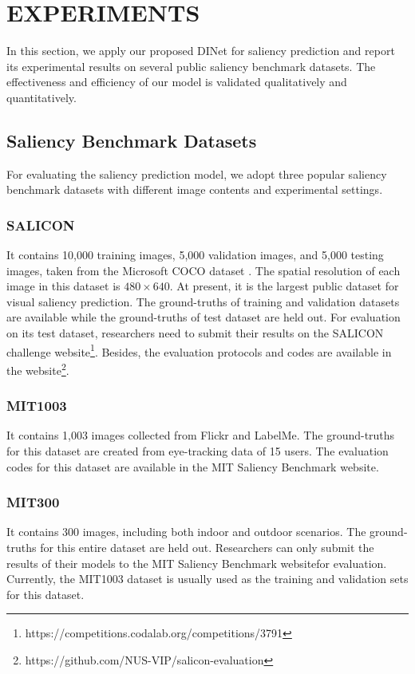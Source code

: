 \section{EXPERIMENTS}
\label{sec:exp}


In this section, we apply our proposed DINet for saliency prediction and report its experimental results on several public saliency benchmark datasets. The effectiveness and efficiency of our model is validated qualitatively and quantitatively. 

\subsection{Saliency Benchmark Datasets} 
For evaluating the saliency prediction model, we adopt three popular saliency benchmark datasets with different image contents and experimental settings.

\subsubsection{SALICON \cite{jiang2015salicon}}
It contains 10,000 training images, 5,000 validation images, and 5,000 testing images, taken from the Microsoft COCO dataset \cite{lin2014microsoft}. The spatial resolution of each image in this dataset is $480 \times 640$. At present, it is the largest public dataset for visual saliency prediction. The ground-truths of training and validation datasets are available while the ground-truths of test dataset are held out. For evaluation on its test dataset, researchers need to submit their results on the SALICON challenge website\footnote{https://competitions.codalab.org/competitions/3791}. Besides, the evaluation protocols and codes are available in the website\footnote{https://github.com/NUS-VIP/salicon-evaluation}.


\subsubsection{MIT1003 \cite{judd2009learning}}
It contains 1,003 images collected from Flickr and LabelMe. The ground-truths for this dataset are created from eye-tracking data of 15 users. The evaluation codes for this dataset are available in the MIT Saliency Benchmark website\footnotemark.

\subsubsection{MIT300 \cite{Judd_2012}}
It contains 300 images, including both indoor and outdoor scenarios. The ground-truths for this entire dataset are held out. Researchers can only submit the results of their models to the MIT Saliency Benchmark website\footnotemark[\value{footnote}] for evaluation. Currently, the MIT1003 dataset is usually used as the training and validation sets for this dataset.

